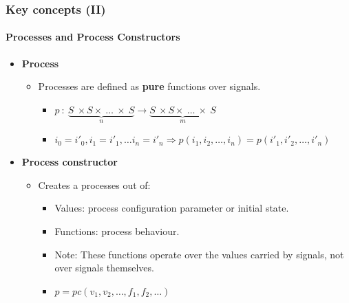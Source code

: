 \documentclass{beamer}
\begin{document}
\begin{frame}
  \frametitle{Key concepts (II)}
  \framesubtitle{Processes and Process Constructors}
  \begin{itemize}
    \item \textbf{Process}\hspace{2.3cm}
      \begin{minipage}{2cm}
        
      \end{minipage}
      \begin{itemize}
      \item Processes are defined as \textbf{pure} functions over signals.
        \begin{itemize}
        \item $p\ :\ \underbrace{S\ \times S \times\ \dots\ \times\ S}_n \rightarrow \underbrace{S\ \times S \times\ \dots\ \times\ S}_m$   
        \item $i_0 = i'_0, i_1 = i'_1, \dots i_n=i'_n \Rightarrow p(i_1,i_2,\dots,i_n) = p(i'_1,i'_2,\dots,i'_n)$
        \end{itemize}
      \end{itemize}
      \pause
      \vspace{0.5cm}
      \item \textbf{Process constructor}\hspace{1cm}
        \begin{minipage}{2cm}
        \end{minipage}
        \begin{itemize}
          \vspace{0.3cm}
          \pause
          \item Creates a processes out of:
            \vspace{0.1cm}
            \begin{itemize}
            \item Values: process configuration parameter or initial state.
            \item Functions: process behaviour.
            \item Note: These functions operate over the values
              carried by signals, not over signals themselves.
            \item $p=pc(v_1,v_2,\dots,f_1,f_2,\dots)$ 
            \end{itemize}
        \end{itemize}
  \end{itemize}
\end{frame}
\end{document}
